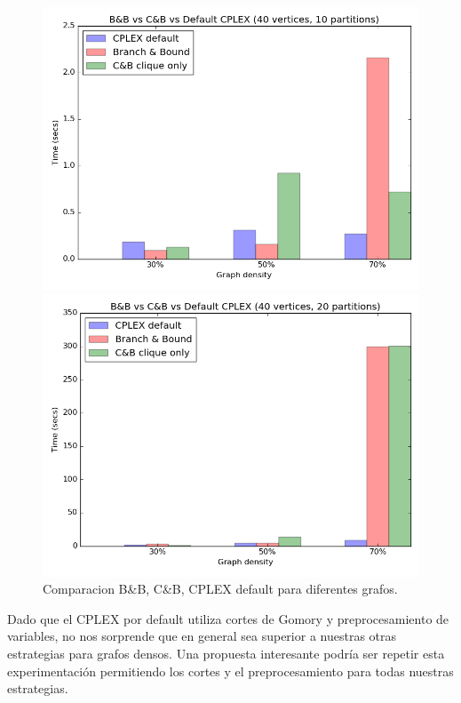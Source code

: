\begin{figure}[h]
\begin{minipage}[b]{0.49\textwidth}
  \end{minipage}
  \begin{minipage}[b]{0.49\textwidth}
    \includegraphics[width=\textwidth]{img/8-compare_v40_p10_i1_l40_t1_b0.png}
  \end{minipage}
  \hfill
  \begin{minipage}[b]{0.49\textwidth}
    \includegraphics[width=\textwidth]{img/8-compare_v40_p20_i1_l40_t1_b0.png}
  \end{minipage}
	\caption{Comparacion B\&B, C\&B, CPLEX default para diferentes grafos.}
\end{figure}

Dado que el CPLEX por default utiliza cortes de Gomory y preprocesamiento de variables, no nos sorprende que en general sea superior a nuestras otras estrategias para grafos densos. Una propuesta interesante podría ser repetir esta experimentación permitiendo los cortes y el preprocesamiento para todas nuestras estrategias.

